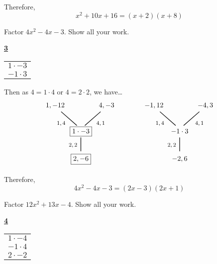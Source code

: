 \documentclass[11pt,letterpaper]{article}
\begin{document}
Therefore,
	\[
	x^2 + 10x + 16= (x + 2)(x + 8)
	\]





\newpage





 Factor $4x^2 - 4x - 3$. Show all your work. \pspace

\sol
	\begin{table}[!ht]
	\centering
	\underline{\bfseries 3} \pvspace{0.1cm}
	\begin{tabular}{c}
	$1 \cdot -3$ \\
	$-1 \cdot 3$
	\end{tabular}
	\end{table}

Then as $4= 1 \cdot 4$ or $4= 2 \cdot 2$, we have\dots
	\[
	\begin{tikzpicture}
	\node at (0,0) {\framebox{$1 \cdot -3$}};
	\node at (-0.4,-0.7) {\footnotesize$2, 2$};
	\draw[line width=0.03cm,label={1}] (0,-0.3) -- (0,-1);
	\node at (0,-1.4) {\framebox{$2, -6$}};
	\node at (-1,0.4) {\footnotesize$1, 4$};	
	\draw[line width=0.03cm] (-0.2,0.3) -- (-1,1);
	\node at (-1.3,1.3) {$1, -12$};
	\node at (1,0.4) {\footnotesize$4, 1$};
	\draw[line width=0.03cm] (0.2,0.3) -- (1,1);
	\node at (1.3,1.3) {$4, -3$};
	
	\tikzset{shift={(5,0)}}

	\node at (0,0) {$-1 \cdot 3$};
	\node at (-0.4,-0.7) {\footnotesize$2, 2$};
	\draw[line width=0.03cm,label={1}] (0,-0.3) -- (0,-1);
	\node at (0,-1.4) {$-2, 6$};
	\node at (-1,0.4) {\footnotesize$1, 4$};	
	\draw[line width=0.03cm] (-0.2,0.3) -- (-1,1);
	\node at (-1.3,1.3) {$-1, 12$};
	\node at (1,0.4) {\footnotesize$4, 1$};
	\draw[line width=0.03cm] (0.2,0.3) -- (1,1);
	\node at (1.3,1.3) {$-4, 3$};
	\end{tikzpicture}
	\]

Therefore, 
	\[
	4x^2 - 4x - 3= (2x - 3)(2x + 1)
	\]





\newpage





 Factor $12x^2 + 13x - 4$. Show all your work. \pspace

\sol
	\begin{table}[!ht]
	\centering
	\underline{\bfseries 4} \pvspace{0.1cm}
	\begin{tabular}{c}
	$1 \cdot -4$ \\
	$-1 \cdot 4$ \\
	$2 \cdot -2$
	\end{tabular}
	\end{table}
\end{document}
